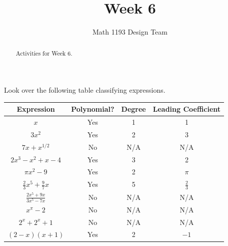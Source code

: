 \documentclass[noauthor]{ximera}
\title{Week 6}
\author{Math 1193 Design Team}
\begin{document}
\begin{abstract}
    Activities for Week 6.
\end{abstract}
\maketitle

\begin{problem}
Look over the following table classifying expressions.

\begin{center}
\begin{tabular}{|c|c|c|c|} 
 \hline
 Expression & Polynomial? & Degree & Leading Coefficient \\
 \hline\hline
 \(x\) & Yes & 1 & 1 \\ 
 \hline
 \(3x^2\) & Yes & 2 & 3 \\
 \hline
 \(7x + x^{1/2}\) & No & N/A & N/A \\
 \hline
 \(2x^3 - x^2 + x - 4\) & Yes & 3 & 2 \\
 \hline
 \(\pi x^2 - 9\) & Yes & 2 & \(\pi\) \\
 \hline
 \(\frac{2}{3}x^5 + \frac{9}{7}x\) & Yes & 5 & \(\frac{2}{3}\) \\
 \hline
 \(\frac{2x^5 + 9x}{3x^5 - 7x}\) & No & N/A & N/A \\
 \hline
 \(x^\pi - 2\) & No & N/A & N/A \\
 \hline
 \(2^x + 2^x + 1\) & No & N/A & N/A \\
 \hline
 \((2 - x)(x + 1)\) & Yes & 2 & \(-1\) \\
 \hline
\end{tabular}
\end{center}


\end{problem}
\end{document}
